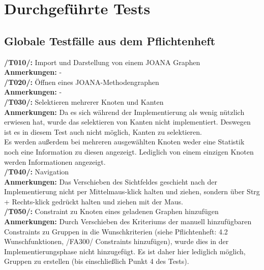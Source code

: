 \chapter{Durchgeführte Tests}
\label{ch:durchgefuehrtetests}

\newcommand\test[2]{\textbf{\arabic{tnr}}\addtocounter{tnr}{1}. & \textbf{Test:} & #1 \\ & \textbf{Aufgabe:} & #2 \\ [1ex] }

\section{Globale Testfälle aus dem Pflichtenheft}

\textbf{/T010/: }Import und Darstellung von einem JOANA Graphen\\
\textbf{Anmerkungen: }-\\

\textbf{/T020/: }Öffnen eines JOANA-Methodengraphen\\
\textbf{Anmerkungen: }-\\

\textbf{/T030/: }Selektieren mehrerer Knoten und Kanten\\
\textbf{Anmerkungen: }Da es sich während der Implementierung als wenig nützlich erwiesen hat, wurde das selektieren von Kanten nicht implementiert. Deswegen ist es in diesem Test auch nicht möglich, Kanten zu selektieren.\\
	Es werden außerdem bei mehreren ausgewählten Knoten weder eine Statistik noch eine Information zu diesen angezeigt. Lediglich von einem einzigen Knoten werden Informationen angezeigt.\\

\textbf{/T040/: }Navigation\\
\textbf{Anmerkungen: }Das Verschieben des Sichtfeldes geschieht nach der Implementierung nicht per Mittelmaus-klick halten und ziehen, sondern über Strg + Rechts-klick gedrückt halten und ziehen mit der Maus.\\

\textbf{/T050/: }Constraint zu Knoten eines geladenen Graphen hinzufügen\\
\textbf{Anmerkungen: }Durch Verschieben des Kriteriums der manuell hinzufügbaren Constraints zu Gruppen in die Wunschkriterien (siehe Pflichtenheft: 4.2 Wunschfunktionen, /FA300/ Constraints hinzufügen), wurde dies in der Implementierungsphase nicht hinzugefügt. Es ist daher hier lediglich möglich, Gruppen zu erstellen (bis einschließlich Punkt 4 des Tests).\\

